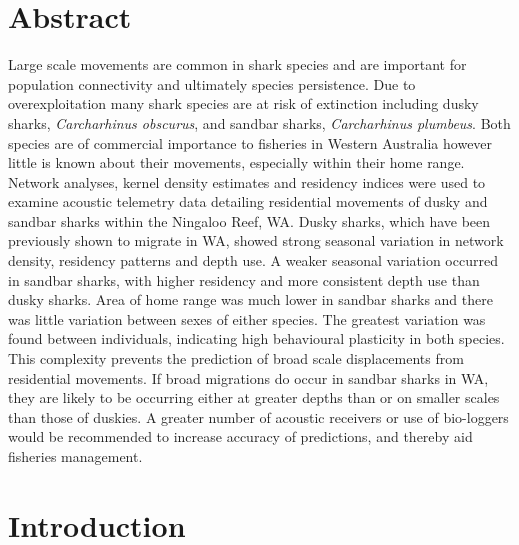 \documentclass[11pt,a4paper]{article}
\begin{document}
	
	
	\linenumbers
	\newpage
	
	\section{Abstract}
	
	Large scale movements are common in shark species and are important for population connectivity and ultimately species persistence. Due to overexploitation many shark species are at risk of extinction including dusky sharks, \textit{Carcharhinus obscurus}, and sandbar sharks, \textit{Carcharhinus plumbeus}. Both species are of commercial importance to fisheries in Western Australia however little is known about their movements, especially within their home range. Network analyses, kernel density estimates and residency indices were used to examine acoustic telemetry data detailing residential movements of dusky and sandbar sharks within the Ningaloo Reef, WA. Dusky sharks, which have been previously shown to migrate in WA, showed strong seasonal variation in network density, residency patterns and depth use. A weaker seasonal variation occurred in sandbar sharks, with higher residency and more consistent depth use than dusky sharks. Area of home range was much lower in sandbar sharks and there was little variation between sexes of either species. The greatest variation was found between individuals, indicating high behavioural plasticity in both species. This complexity prevents the prediction of broad scale displacements from residential movements. If broad migrations do occur in sandbar sharks in WA, they are likely to be occurring either at greater depths than or on smaller scales than those of duskies. A greater number of acoustic receivers or use of bio-loggers would be recommended to increase accuracy of predictions, and thereby aid fisheries management.
	
	\newpage
	
	\section{Introduction}
	
\end{document}

